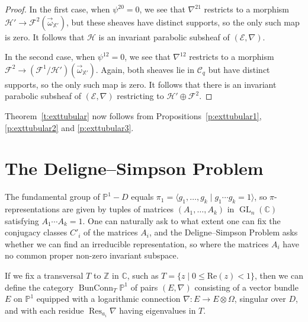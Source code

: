 \documentclass[12pt,a4paper]{amsart}
\theoremstyle{plain}
\newcommand{\C}{\mathbb C}
\newcommand{\Z}{\mathbb Z}
\newcommand{\PP}{\mathbb P}
\DeclareMathOperator{\GL}{GL}
\DeclareMathOperator{\Res}{Res}
\DeclareMathOperator{\BunConn}{BunConn}
\newcommand{\F}{\mathcal F}
\newcommand{\E}{\mathcal E}
\newcommand{\CC}{\mathcal C}
\newcommand{\XX}{\mathbb X}
\newcommand{\oom}{\vec{\omega}}
\begin{document}
\begin{proof}
In the first case, when $\psi^{20}=0$, we see that $\nabla^{21}$ restricts to a morphism $\mathcal H'\to\F^2(\oom_{\XX'})$, but these sheaves have distinct supports, so the only such map is zero. It follows that $\mathcal H$ is an invariant parabolic subsheaf of $(\E,\nabla)$.

In the second case, when $\psi^{12}=0$, we see that $\nabla^{12}$ restricts to a morphism $\F^2\to(\F^1/\mathcal H')(\oom_{\XX'})$. Again, both sheaves lie in $\CC_q$ but have distinct supports, so the only such map is zero. It follows that there is an invariant parabolic subsheaf of $(\E,\nabla)$ restricting to $\mathcal H'\oplus\F^2$.
\end{proof}

Theorem~\ref{t:exttubular} now follows from Propositions~\ref{p:exttubular1}, \ref{p:exttubular2} and \ref{p:exttubular3}.














\section{The Deligne--Simpson Problem}


The fundamental group of $\PP^1-D$ equals $\pi_1=\langle g_1,\ldots,g_k\mid g_1\cdots g_k=1\rangle$, so $\pi$-representations are given by tuples of matrices $(A_1,\ldots,A_k)$ in $\GL_n(\C)$ satisfying $A_1\cdots A_k=1$. One can naturally ask to what extent one can fix the conjugacy classes $C'_i$ of the matrices $A_i$, and the Deligne--Simpson Problem asks whether we can find an irreducible representation, so where the matrices $A_i$ have no common proper non-zero invariant subspace.

If we fix a transversal $T$ to $\Z$ in $\C$, such as $T = \{z \mid 0 \le \mathrm{Re}(z)<1\}$, then we can define the category $\BunConn_T\PP^1$ of pairs $(E,\nabla)$ consisting of a vector bundle $E$ on $\PP^1$ equipped with a logarithmic connection $\nabla\colon E\to E\otimes\Omega$, singular over $D$, and with each residue $\Res_{a_i}\nabla$ having eigenvalues in $T$.
\end{document}
